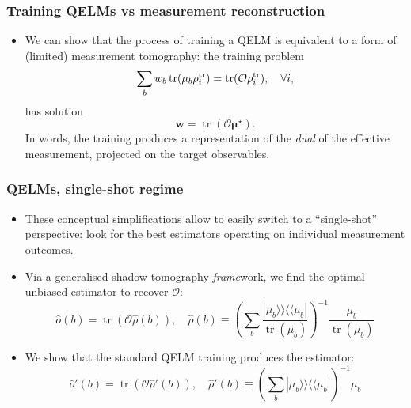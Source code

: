 \documentclass{beamer}
\begin{document}
\begin{frame}
\frametitle{Training QELMs vs measurement reconstruction}

\begin{itemize}
    \item We can show that the process of training a QELM is equivalent to a form of (limited) measurement tomography:
    the training problem
    \begin{equation}
        \sum_b w_b\operatorname{tr}(\mu_b\rho_i^{\rm tr}) = \operatorname{tr}(\mathcal O\rho_i^{\rm tr}), \quad\forall i,
    \end{equation}
    has solution
    \begin{equation}
        \mathbf w = \operatorname{tr}(\mathcal O \boldsymbol\mu^\star).
    \end{equation}
    In words, the training produces a representation of the \textit{dual} of the effective measurement, projected on the target observables.
\end{itemize}
    
\end{frame}


\begin{frame}
\frametitle{QELMs, single-shot regime}

\begin{itemize}
    \item These conceptual simplifications allow to easily switch to a ``single-shot'' perspective: look for the best estimators operating on individual measurement outcomes.
    \item Via a generalised shadow tomography \textit{frame}work, we find the optimal unbiased estimator to recover $\mathcal O$:
    \begin{equation}
        \hat o(b) = \operatorname{tr}(\mathcal O \hat\rho(b)),
        \quad
        \hat\rho(b)\equiv  \left(\sum_b \frac{|\mu_b\rangle\!\rangle\!\langle\!\langle \mu_b|}{\operatorname{tr}(\mu_b)} \right)^{-1}
        \frac{\mu_b}{\operatorname{tr}(\mu_b)}
    \end{equation}
    \item We show that the standard QELM training produces the estimator:
    \begin{equation}
        \hat o'(b) = \operatorname{tr}(\mathcal O\hat\rho'(b)),
        \quad \hat\rho'(b) \equiv
        \left(\sum_b|\mu_b\rangle\!\rangle\!\langle\!\langle\mu_b|\right)^{-1}\mu_b
    \end{equation}
\end{itemize}

\end{frame}
\end{document}
